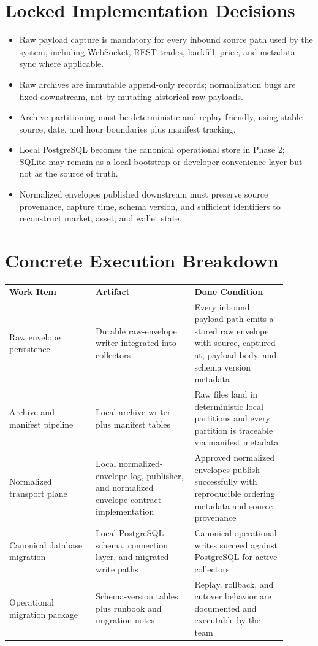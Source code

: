 \documentclass{article}
\begin{document}
\section*{Locked Implementation Decisions}
\begin{itemize}
\item Raw payload capture is mandatory for every inbound source path used by the system, including WebSocket, REST trades, backfill, price, and metadata sync where applicable.
\item Raw archives are immutable append-only records; normalization bugs are fixed downstream, not by mutating historical raw payloads.
\item Archive partitioning must be deterministic and replay-friendly, using stable source, date, and hour boundaries plus manifest tracking.
\item Local PostgreSQL becomes the canonical operational store in Phase 2; SQLite may remain as a local bootstrap or developer convenience layer but not as the source of truth.
\item Normalized envelopes published downstream must preserve source provenance, capture time, schema version, and sufficient identifiers to reconstruct market, asset, and wallet state.
\end{itemize}

\section*{Concrete Execution Breakdown}
\begin{longtable}{p{0.28\linewidth}p{0.32\linewidth}p{0.30\linewidth}}
\textbf{Work Item} & \textbf{Artifact} & \textbf{Done Condition} \\
Raw envelope persistence & Durable raw-envelope writer integrated into collectors & Every inbound payload path emits a stored raw envelope with source, captured-at, payload body, and schema version metadata \\
Archive and manifest pipeline & Local archive writer plus manifest tables & Raw files land in deterministic local partitions and every partition is traceable via manifest metadata \\
Normalized transport plane & Local normalized-envelope log, publisher, and normalized envelope contract implementation & Approved normalized envelopes publish successfully with reproducible ordering metadata and source provenance \\
Canonical database migration & Local PostgreSQL schema, connection layer, and migrated write paths & Canonical operational writes succeed against PostgreSQL for active collectors \\
Operational migration package & Schema-version tables plus runbook and migration notes & Replay, rollback, and cutover behavior are documented and executable by the team \\
\end{longtable}
\end{document}

